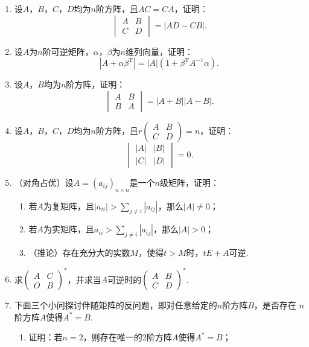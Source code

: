 \begin{enumerate}
    \item 设$A$，$B$，$C$，$D$均为$n$阶方阵，且$AC=CA$，证明：
	\[\begin{vmatrix}
		A & B \\ C & D
	\end{vmatrix} = |AD-CB|.\]

	\item 设$A$为$n$阶可逆矩阵，$\alpha$，$\beta$为$n$维列向量，证明：
	\[|A+\alpha\beta^{\mathrm{T}}|=|A|(1+\beta^\mathrm{T}A^{-1}\alpha).\]
	\item 设$A$，$B$均为$n$阶方阵，证明：
	\[\begin{vmatrix}
		A & B \\ B & A
	\end{vmatrix} = |A+B||A-B|.\]
	\item 设$A$，$B$，$C$，$D$均为$n$阶方阵，且$r\begin{pmatrix}
		A & B \\ C & D
	\end{pmatrix}=n$，证明：
	\[\begin{vmatrix}
		|A| & |B| \\ |C| & |D|
	\end{vmatrix} = 0.\]
	\item （对角占优）设$A=(a_{ij})_{n \times n}$是一个$n$级矩阵，证明：
	\begin{enumerate}[label=(\arabic*)]
        \item 若$A$为复矩阵，且$|a_{ii}|>\sum_{j \neq i}|a_{ij}|$，那么$|A|\neq 0$；
        \item 若$A$为实矩阵，且$a_{ii}>\sum_{j \neq i}|a_{ij}|$，那么$|A|>0$；
        \item （推论）存在充分大的实数$M$，使得$t>M$时，$tE+A$可逆.
    \end{enumerate}
    \item 求$\begin{pmatrix}
		A & C \\ O & B
	\end{pmatrix}^*$，并求当$A$可逆时的$\begin{pmatrix}
		A & B \\ C & D
	\end{pmatrix}^*$.
	\item 下面三个小问探讨伴随矩阵的反问题，即对任意给定的$n$阶方阵$B$，是否存在
	$n$阶方阵$A$使得$A^*=B$.
    \begin{enumerate}[label=(\arabic*)]
        \item 证明：若$n=2$，则存在唯一的2阶方阵$A$使得$A^*=B$；

\end{enumerate}
\end{enumerate}
